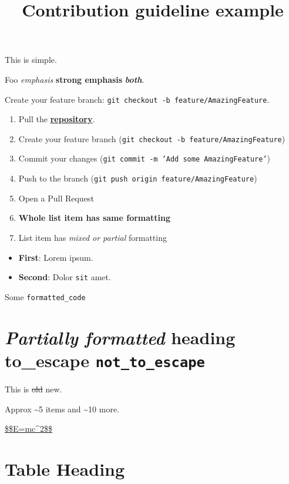 \documentclass[11pt,a4paper]{article}
\title{Contribution guideline example}
\begin{document}
\maketitle

This is simple.

Foo \textit{emphasis} \textbf{strong emphasis} \textit{\textbf{both}}.

Create your feature branch: \texttt{git checkout -b feature/AmazingFeature}.

\begin{enumerate}
\item Pull the \href{https://github.com/docling-project/docling}{\textbf{repository}}.
\item Create your feature branch (\texttt{git checkout -b feature/AmazingFeature})
\item Commit your changes (\texttt{git commit -m 'Add some AmazingFeature'})
\item Push to the branch (\texttt{git push origin feature/AmazingFeature})
\item Open a Pull Request
\item \textbf{Whole list item has same formatting}
\item List item has \textit{mixed or partial} formatting
\end{enumerate}

\begin{itemize}
\item \textbf{First}: Lorem ipsum.
\item \textbf{Second}: Dolor \texttt{sit} amet.
\end{itemize}

Some \texttt{formatted_code}

\section{\textit{Partially formatted} heading to\_escape \texttt{not_to_escape}}

This is \sout{old} new.

Approx \textasciitilde{}5 items and \textasciitilde{}10 more.

\href{https://en.wikipedia.org/wiki/Albert\_Einstein}{\$\$E=mc\textasciicircum{}2\$\$}

\section{Table Heading}
\end{document}
